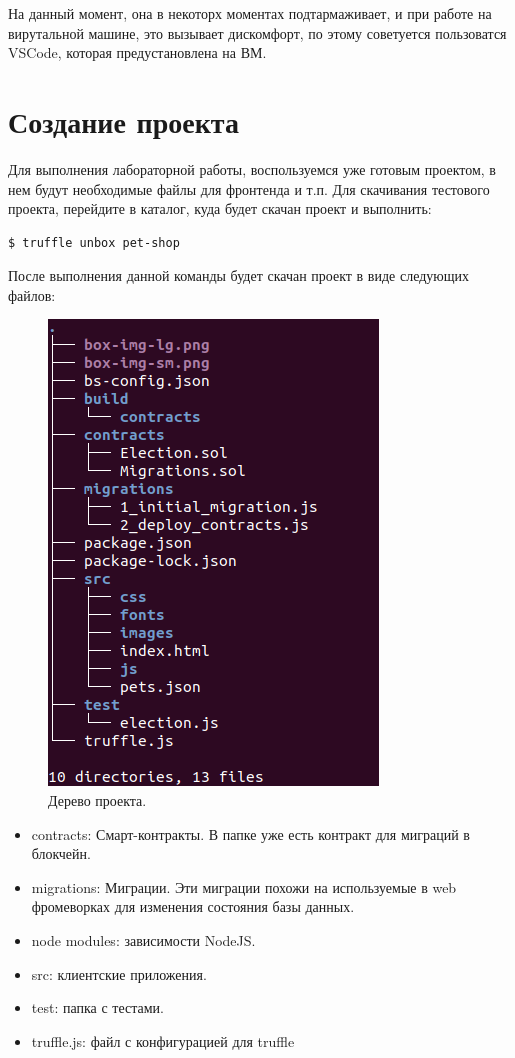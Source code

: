 \documentclass{article}
\begin{document}
На данный момент, она в некоторх моментах подтармаживает, и при работе на вирутальной машине, это вызывает дискомфорт, по этому советуется пользоватся VSCode, которая предустановлена на ВМ.

\section{Создание проекта}

Для выполнения лабораторной работы, воспользуемся уже готовым проектом, в нем будут необходимые файлы для фронтенда и т.п. Для скачивания тестового проекта, перейдите в каталог, куда будет скачан проект и выполнить:

\begin{lstlisting}[caption={Скачивание проекта pet-shop}]
$ truffle unbox pet-shop
\end{lstlisting}


После выполнения данной команды будет скачан проект в виде следующих файлов:

\begin{figure}
    \centering
    \includegraphics[scale=0.4]{project_tree}
    \caption{Дерево проекта.}
    \label{fig:project_tree}
\end{figure}


\begin{itemize}
	\item contracts:  Смарт-контракты. В папке уже есть контракт для миграций в блокчейн.
	\item migrations: Миграции. Эти миграции похожи на используемые в web фромеворках для изменения состояния базы данных.
	\item node modules: зависимости NodeJS.
	\item src: клиентские приложения.
	\item test: папка с тестами.
	\item truffle.js: файл с конфигурацией для truffle
\end{itemize}
\end{document}
